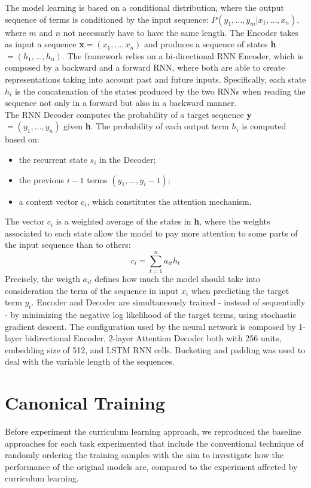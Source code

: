 The model learning is based on a conditional distribution, where the output sequence of terms is conditioned
by the input sequence: \(P(y_1,...,y_m|x_1,...,x_n)\), where \(m\) and \(n\) not necessarly have to have the same length.
The Encoder takes as input a sequence \textbf{x}\(= (x_1,...,x_n)\) and produces
a sequence of states \textbf{h}\(= (h_1,...,h_n)\). The framework relies on a bi-directional
RNN Encoder, which is composed by a backward and a forward RNN, where both are able to create representations taking into account
past and future inputs. Specifically, each state \(h_i\) is the concatenation of the states produced by 
the two RNNs when reading the sequence not only in a forward but also in a backward manner.\\
The RNN Decoder computes the probability of a target sequence \textbf{y}\(= (y_1,...,y_n)\) given \textbf{h}. The probability
of each output term \(h_i\) is computed based on:
\begin{itemize}
    \item the recurrent state \(s_i\) in the Decoder;
    \item the previous \(i - 1\) terms \((y_1,...,y_i-1)\);
    \item a context vector \(c_i\), which constitutes the attention mechanism.
\end{itemize}
The vector \(c_i\) is a weighted average of the states in \textbf{h}, where the weights associated 
to each state allow the model to pay more attention to some parts of the input sequence than to others:
\[c_i = \sum_{t=1}^n a_{it} h_t\]
Precisely, the weigth \(a_{it}\) defines how much the model should take into consideration the term of the sequence in input \(x_i\)
when predicting the target term \(y_t\). Encoder and Decoder are simultaneously trained - instead of sequentially - by minimizing
the negative log likelihood of the target terms, using stochastic gradient descent.
The configuration used by the neural network is composed by 1-layer bidirectional Encoder, 
2-layer Attention Decoder both with 256 units, embedding size of 512, 
and LSTM RNN cells. Bucketing and padding was used to deal with the variable length of the sequences.


\section{Canonical Training}
Before experiment the curriculum learning approach, we reproduced the baseline approaches for each task experimented
that include the conventional technique of randomly ordering the training samples with the aim to investigate how the performance 
of the original models are, compared to the experiment affected by curriculum learning.

